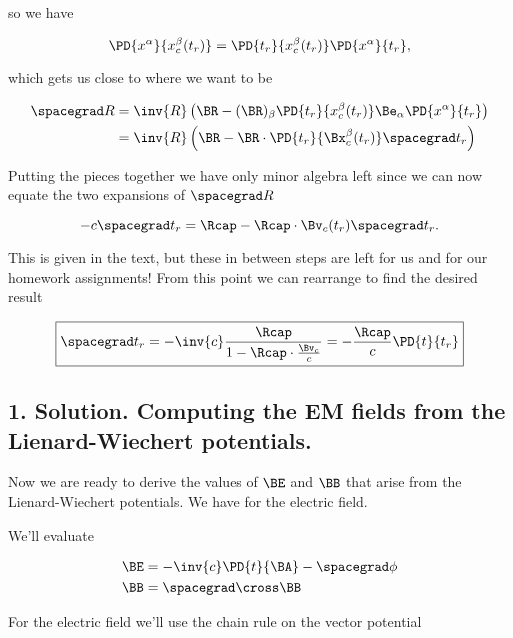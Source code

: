 so we have

\begin{equation}\label{eqn:relElectroDynProblemSet5:340}
\PD{x^\alpha}{x_c^\beta(t_r)} = \PD{t_r}{x_c^\beta(t_r)} \PD{x^\alpha}{t_r},
\end{equation}

which gets us close to where we want to be

\begin{align*}
\spacegrad R
&=
\inv{R} \left(\BR - (\BR)_\beta \PD{t_r}{x_c^\beta(t_r)} \Be_\alpha \PD{x^\alpha}{t_r} \right) \\
&=
\inv{R} \left(\BR - \BR \cdot \PD{t_r}{\Bx_c^\beta(t_r)} \spacegrad t_r \right)
\end{align*}

Putting the pieces together we have only minor algebra left since we can now equate the two expansions of $\spacegrad R$

\begin{equation}\label{eqn:relElectroDynProblemSet5:360}
- c \spacegrad t_r = \Rcap - \Rcap \cdot \Bv_c(t_r) \spacegrad t_r.
\end{equation}

This is given in the text, but these in between steps are left for us and for our homework assignments!  From this point we can rearrange to find the desired result

\begin{equation}\label{eqn:relElectroDynProblemSet5:380}
\boxed{
\spacegrad t_r = -\inv{c} \frac{\Rcap }{ 1 - \Rcap \cdot \frac{\Bv_c}{c} } = - \frac{\Rcap}{c} \PD{t}{t_r}
}
\end{equation}

\subsection{1. Solution.  Computing the EM fields from the Lienard-Wiechert potentials.}

Now we are ready to derive the values of $\BE$ and $\BB$ that arise from the Lienard-Wiechert potentials.  We have for the electric field.

We'll evaluate 

\begin{align*}
\BE &= -\inv{c} \PD{t}{\BA} - \spacegrad \phi \\
\BB &= \spacegrad \cross \BB
\end{align*}

For the electric field we'll use the chain rule on the vector potential


